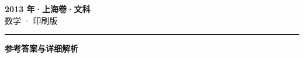 \documentclass[zihao=5, a4paper]{ctexart}
\begin{document}
\begin{center}
  {\Large\bfseries 2013 年·上海卷·文科}\\[4pt]
  {\large 数学 · 印刷版}
\end{center}
\medskip
{}

\par\bigskip\hrule\bigskip
{}
\Needspace{0.55\textheight}
\begin{center}{\large\bfseries 参考答案与详细解析}\end{center}
\smallskip

\end{document}

